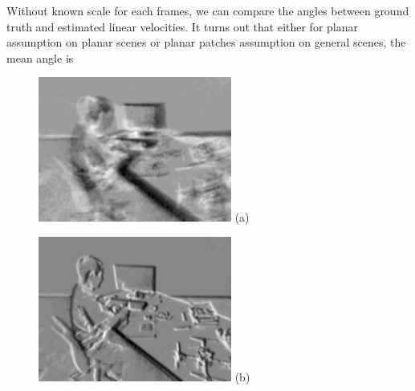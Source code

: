   Without known scale for each frames, we can compare the angles
  between ground truth and estimated linear velocities. It turns out
  that either for planar assumption on planar scenes or planar patches
  assumption on general scenes, the mean angle is
  \begin{figure}[H]
    \begin{minipage}[t]{0.48\textwidth}
      \centering \includegraphics[width =
      \textwidth]{images/zero_motion_934.jpg} (a)
    \end{minipage}
    \hfill
    \begin{minipage}[t]{0.48\textwidth}
      \centering \includegraphics[width =
      \textwidth]{images/optimized_934.jpg} (b)
    \end{minipage}

\end{figure}
